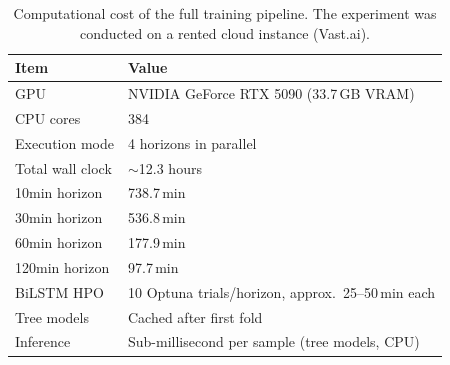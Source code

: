 \begin{table}[htbp]
  \centering
  \caption{Computational cost of the full training pipeline. The experiment was conducted on a rented cloud instance (Vast.ai).}
  \label{tab:computational-cost}
  \begin{tabular}{ll}
    \toprule
    \textbf{Item} & \textbf{Value} \\
    \midrule
    GPU & NVIDIA GeForce RTX 5090 (33.7\,GB VRAM) \\
    CPU cores & 384 \\
    Execution mode & 4 horizons in parallel \\
    Total wall clock & $\sim$12.3 hours \\
    \midrule
    \quad 10min horizon & 738.7\,min \\
    \quad 30min horizon & 536.8\,min \\
    \quad 60min horizon & 177.9\,min \\
    \quad 120min horizon & 97.7\,min \\
    \midrule
    BiLSTM HPO & 10 Optuna trials/horizon, approx.\ 25--50\,min each \\
    Tree models & Cached after first fold \\
    Inference & Sub-millisecond per sample (tree models, CPU) \\
    \bottomrule
  \end{tabular}
\end{table}
